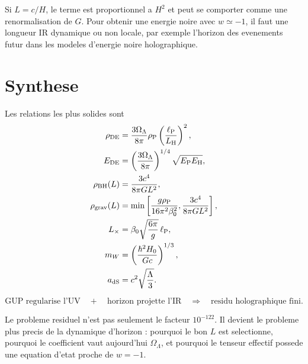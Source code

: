 \documentclass[11pt,a4paper]{article}
\newcommand{\lp}{\ell_{\rm P}}
\newcommand{\rhoP}{\rho_{\rm P}}
\newcommand{\rhoDE}{\rho_{\rm DE}}
\newcommand{\LH}{L_{\rm H}}
\newcommand{\EP}{E_{\rm P}}
\newcommand{\EH}{E_{\rm H}}
\newcommand{\rhobh}{\rho_{\rm BH}}
\begin{document}
Si $L=c/H$, le terme est proportionnel a $H^2$ et peut se comporter comme une
renormalisation de $G$. Pour obtenir une energie noire avec $w\simeq-1$, il
faut une longueur IR dynamique ou non locale, par exemple l'horizon des
evenements futur dans les modeles d'energie noire holographique.

\section{Synthese}

Les relations les plus solides sont
\begin{align}
\rhoDE
&=
\frac{3\Omega_\Lambda}{8\pi}\rhoP
\left(\frac{\lp}{\LH}\right)^2,\\
E_{\rm DE}
&=
\left(\frac{3\Omega_\Lambda}{8\pi}\right)^{1/4}
\sqrt{\EP\EH},\\
\rhobh(L)
&=
\frac{3c^4}{8\pi G L^2},\\
\rho_{\rm grav}(L)
&=
\min\left[
\frac{g\rhoP}{16\pi^2\beta_0^2},
\frac{3c^4}{8\pi G L^2}
\right],\\
L_\times
&=
\beta_0\sqrt{\frac{6\pi}{g}}\,\lp,\\
m_W
&=
\left(\frac{\hbar^2H_0}{Gc}\right)^{1/3},\\
a_{\rm dS}
&=
c^2\sqrt{\frac{\Lambda}{3}}.
\end{align}

\begin{tcolorbox}[colback=yellow!5!white,colframe=yellow!40!black,title=Conclusion structurante]
\[
\text{GUP regularise l'UV}
\quad+\quad
\text{horizon projette l'IR}
\quad\Longrightarrow\quad
\text{residu holographique fini.}
\]
\end{tcolorbox}

Le probleme residuel n'est pas seulement le facteur $10^{-122}$. Il devient le
probleme plus precis de la dynamique d'horizon : pourquoi le bon $L$ est
selectionne, pourquoi le coefficient vaut aujourd'hui $\Omega_\Lambda$, et
pourquoi le tenseur effectif possede une equation d'etat proche de $w=-1$.
\end{document}
